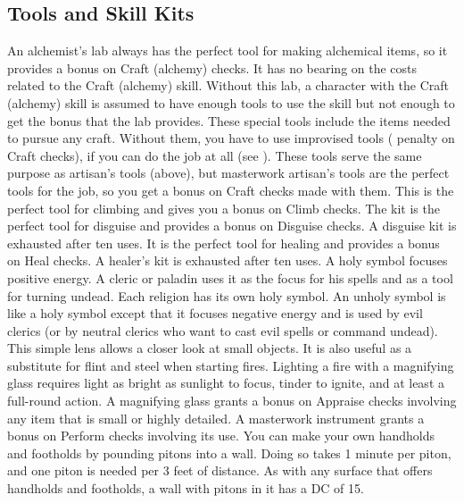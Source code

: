 \subsection{Tools and Skill Kits}
 An alchemist's lab always has the perfect tool for making alchemical items, so it provides a  bonus on Craft (alchemy) checks. It has no bearing on the costs related to the Craft (alchemy) skill. Without this lab, a character with the Craft (alchemy) skill is assumed to have enough tools to use the skill but not enough to get the  bonus that the lab provides.
 These special tools include the items needed to pursue any craft. Without them, you have to use improvised tools ( penalty on Craft checks), if you can do the job at all (see ).
 These tools serve the same purpose as artisan's tools (above), but masterwork artisan's tools are the perfect tools for the job, so you get a  bonus on Craft checks made with them.
 This is the perfect tool for climbing and gives you a  bonus on Climb checks.
 The kit is the perfect tool for disguise and provides a  bonus on Disguise checks. A disguise kit is exhausted after ten uses.
 It is the perfect tool for healing and provides a  bonus on Heal checks. A healer's kit is exhausted after ten uses.
 A holy symbol focuses positive energy. A cleric or paladin uses it as the focus for his spells and as a tool for turning undead. Each religion has its own holy symbol.
 An unholy symbol is like a holy symbol except that it focuses negative energy and is used by evil clerics (or by neutral clerics who want to cast evil spells or command undead).
 This simple lens allows a closer look at small objects. It is also useful as a substitute for flint and steel when starting fires. Lighting a fire with a magnifying glass requires light as bright as sunlight to focus, tinder to ignite, and at least a full-round action. A magnifying glass grants a  bonus on Appraise checks
involving any item that is small or highly detailed.
 A masterwork instrument grants a  bonus on Perform checks involving its use.
 You can make your own handholds and footholds by pounding pitons into a wall. Doing so takes 1 minute per piton, and one piton is needed per 3 feet of distance. As with any surface that offers handholds and footholds, a wall with pitons in it has a DC of 15.
